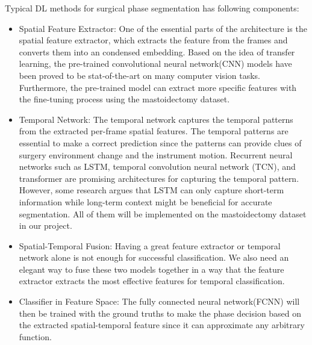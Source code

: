 \documentclass[11pt]{article} \usepackage[top=1in, bottom=1in, left=1in, right=1in]{geometry}
\begin{document}
\vspace{0.25cm}
\noindent
Typical DL methods for surgical phase segmentation has following components:
\begin{itemize}
  \item Spatial Feature Extractor: One of the essential parts of the architecture is the spatial feature extractor, which extracts the feature from the frames and converts them into an condensed embedding. Based on the idea of transfer learning, the pre-trained convolutional neural network(CNN) models have been proved to be stat-of-the-art on many computer vision tasks. Furthermore, the pre-trained model can extract more specific features with the fine-tuning process using the mastoidectomy dataset.\cite{EndoNet}
  \item Temporal Network: The temporal network captures the temporal patterns from the extracted per-frame spatial features. The temporal patterns are essential to make a correct prediction since the patterns can provide clues of surgery environment change and the instrument motion. Recurrent neural networks such as LSTM, temporal convolution neural network (TCN), and transformer are promising architectures for capturing the temporal pattern. However, some research argues that LSTM can only capture short-term information while long-term context might be beneficial for accurate segmentation.\cite{lstm} All of them will be implemented on the mastoidectomy dataset in our project.
  \item Spatial-Temporal Fusion: Having a great feature extractor or temporal network alone is not enough for successful classification. We also need an elegant way to fuse these two models together in a way that the feature extractor extracts the most effective features for temporal classification.
  \item Classifier in Feature Space: The fully connected neural network(FCNN) will then be trained with the ground truths to make the phase decision based on the extracted spatial-temporal feature since it can approximate any arbitrary function.
\end{itemize}
\end{document}
